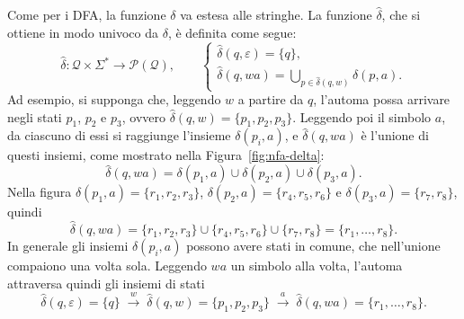 \documentclass[a4paper, 11pt, oneside]{book}
\theoremstyle{formale}
\begin{document}
    Come per i DFA, la funzione $\delta$ va estesa alle stringhe. La funzione
    $\hat{\delta}$, che si ottiene in modo univoco da $\delta$, \`e definita come segue:
    \begin{equation*}
        \hat{\delta} \colon \mathcal{Q} \times \Sigma^* \to \mathcal{P}(\mathcal{Q}),
        \qquad
        \begin{cases}
            \hat{\delta}(q, \varepsilon) = \{q\}, \\
            \hat{\delta}(q, wa) = \bigcup_{p \in \hat{\delta}(q, w)} \delta(p, a).
        \end{cases}
    \end{equation*}
    Ad esempio, si supponga che, leggendo $w$ a partire da $q$, l'automa possa arrivare
    negli stati $p_1$, $p_2$ e $p_3$, ovvero $\hat{\delta}(q, w) = \{p_1, p_2, p_3\}$.
    Leggendo poi il simbolo $a$, da ciascuno di essi si raggiunge l'insieme
    $\delta(p_i, a)$, e $\hat{\delta}(q, wa)$ \`e l'unione di questi insiemi, come mostrato
    nella Figura~\ref{fig:nfa-delta}:
    \begin{equation*}
        \hat{\delta}(q, wa) = \delta(p_1, a) \cup \delta(p_2, a) \cup \delta(p_3, a).
    \end{equation*}
    Nella figura $\delta(p_1, a) = \{r_1, r_2, r_3\}$, $\delta(p_2, a) = \{r_4, r_5, r_6\}$ e
    $\delta(p_3, a) = \{r_7, r_8\}$, quindi
    \begin{equation*}
        \hat{\delta}(q, wa) = \{r_1, r_2, r_3\} \cup \{r_4, r_5, r_6\} \cup \{r_7, r_8\}
        = \{r_1, \dots, r_8\}.
    \end{equation*}
    In generale gli insiemi $\delta(p_i, a)$ possono avere stati in comune, che
    nell'unione compaiono una volta sola. Leggendo $wa$ un simbolo alla volta, l'automa
    attraversa quindi gli insiemi di stati
    \begin{equation*}
        \hat{\delta}(q, \varepsilon) = \{q\}
        \;\xrightarrow{\;w\;}\;
        \hat{\delta}(q, w) = \{p_1, p_2, p_3\}
        \;\xrightarrow{\;a\;}\;
        \hat{\delta}(q, wa) = \{r_1, \dots, r_8\}.
    \end{equation*}
\end{document}
